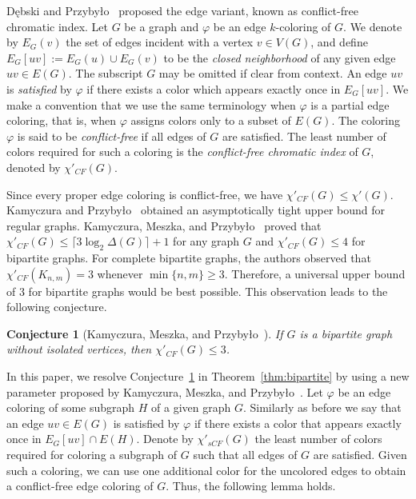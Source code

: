 \documentclass[11pt]{article}
\theoremstyle{plain}
\newtheorem{conj}[thm]{Conjecture}
\numberwithin{equation}{section}
\begin{document}
D\k{e}bski and Przyby{\l}o~\cite{DebskiPrzybylo2022} proposed the edge variant, known as conflict-free chromatic index. Let $G$ be a graph and $\varphi$ be an edge $k$-coloring of $G$. We denote by $E_G(v)$ the set of edges incident with a vertex $v\in V(G)$, and define $E_G[uv] := E_G(u)\cup E_G(v)$ to be the \emph{closed neighborhood} of any given edge $uv\in E(G)$. The subscript $G$ may be omitted if clear from context. An edge $uv$ is \emph{satisfied} by $\varphi$ if there exists a color which appears exactly once in $E_G[uv]$. We make a convention that we use the same terminology when $\varphi$ is a partial edge coloring, that is, when $\varphi$ assigns colors only to a subset of $E(G)$. The coloring $\varphi$ is said to be \emph{conflict-free} if all edges of $G$ are satisfied. The least number of colors required for such a coloring is the \emph{conflict-free chromatic index} of $G$, denoted by $\chi'_{CF}(G)$.

Since every proper edge coloring is conflict-free, we have $\chi'_{CF}(G)\le \chi'(G)$. Kamyczura and Przyby{\l}o~\cite{KP2026} obtained an asymptotically tight upper bound for regular graphs. Kamyczura, Meszka, and Przyby{\l}o~\cite{KamyczuraMeszkaPrzybylo2024} proved that $\chi'_{CF}(G)\le \lceil 3\log_2 \Delta(G)\rceil+1$ for any graph $G$ and $\chi'_{CF}(G)\le 4$ for bipartite graphs. For complete bipartite graphs, the authors observed that $\chi'_{CF}(K_{n,m})=3$ whenever $\min\{n,m\}\ge 3$. Therefore, a universal upper bound of $3$ for bipartite graphs would be best possible. This observation leads to the following conjecture.


\begin{conj}[Kamyczura, Meszka, and Przyby{\l}o~\cite{KamyczuraMeszkaPrzybylo2024}]
\label{conj:bipartite}
If $G$ is a bipartite graph without isolated vertices, then $\chi'_{CF}(G)\le 3$.
\end{conj}

In this paper, we resolve Conjecture~\ref{conj:bipartite} in Theorem~\ref{thm:bipartite} by using a new parameter proposed by Kamyczura, Meszka, and Przyby{\l}o~\cite{KamyczuraMeszkaPrzybylo2024}. Let $\varphi$ be an edge coloring of some subgraph $H$ of a given graph $G$. Similarly as before we say that an edge $uv\in E(G)$ is satisfied by $\varphi$ if there exists a color that appears exactly once in $E_G[uv]\cap E(H)$. Denote by $\chi'_{sCF}(G)$ the least number of colors required for coloring a subgraph of $G$
such that all edges of $G$ are satisfied. Given such a coloring, we can use one additional color  for the uncolored edges to obtain a conflict-free edge coloring of $G$. Thus, the following lemma holds.
\end{document}
